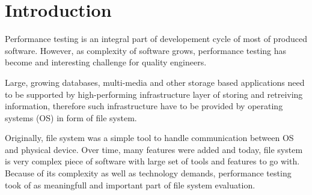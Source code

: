 \documentclass[
  color, %
  table, %
  lof,   %
  lot,   %
]{fithesis3}
\begin{document}
\chapter{Introduction}

Performance testing is an integral part of developement cycle of most of produced software. However, as complexity of software grows, performance testing has become and interesting challenge for quality engineers.

Large, growing databases, multi-media and other storage based applications need to be supported by high-performing infrastructure layer of storing and retreiving information, therefore such infrastructure have to be provided by operating systems (OS) in form of file system.

Originally, file system was a simple tool to handle communication between OS and physical device. Over time, many features were added and today, file system is very complex piece of software with large set of tools and features to go with. Because of its complexity as well as technology demands, performance testing took of as meaningfull and important part of file system evaluation.


\end{document}
